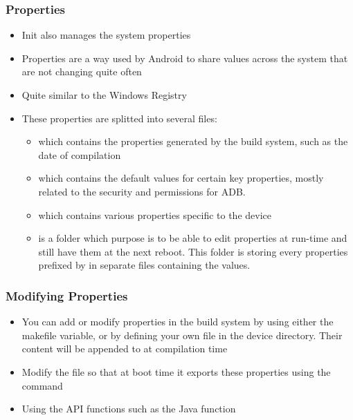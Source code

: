 \begin{frame}
  \frametitle{Properties}
  \begin{itemize}
  \item Init also manages the system properties
  \item Properties are a way used by Android to share values across
    the system that are not changing quite often
  \item Quite similar to the Windows Registry
  \item These properties are splitted into several files:
    \begin{itemize}
    \item {} which contains the properties
      generated by the build system, such as the date of compilation
    \item {} which contains the default values for
      certain key properties, mostly related to the security and
      permissions for ADB.
    \item {} which contains various properties
      specific to the device
    \item {} is a folder which purpose is to be
      able to edit properties at run-time and still have them at the
      next reboot. This folder is storing every properties prefixed by
       in separate files containing the values.
    \end{itemize}
  \end{itemize}
\end{frame}

\begin{frame}
  \frametitle{Modifying Properties}
  \begin{itemize}
  \item You can add or modify properties in the build system by using
    either the  makefile variable, or
    by defining your own  file in the device
    directory. Their content will be appended to
     at compilation time
  \item Modify the  file so that at boot time it exports
    these properties using the  command
  \item Using the API functions such as the Java function
  \end{itemize}
\end{frame}

